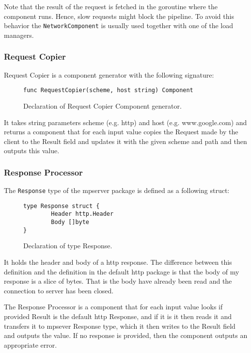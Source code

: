 Note that the result of the request is fetched in the goroutine where the
component runs. Hence, slow requests might block the pipeline. To avoid
this behavior the \texttt{NetworkComponent} is usually used together with one
of the load managers.

\subsubsection{Request Copier}
Request Copier is a component generator with the following signature:
\begin{figure}[h]
\centering
\begin{lstlisting}
func RequestCopier(scheme, host string) Component
\end{lstlisting}
\caption[scale=1.0]{Declaration of Request Copier Component generator.}
\label{fig:RequestCopier}
\end{figure}
It takes string parameters scheme (e.g. http) and host (e.g. www.google.com) 
and returns a component that for each input value copies the Request made 
by the client to the Result field and updates it with the given scheme and 
path and then outputs this value.

\subsubsection{Response Processor}
The \texttt{Response} type of the mpserver package is defined as a following struct:

\begin{figure}[h]
\centering
\begin{lstlisting}
type Response struct {
		Header http.Header
		Body []byte
}
\end{lstlisting}
\caption[scale=1.0]{Declaration of type Response.}
\label{fig:Response}
\end{figure}

It holds the header and body of a http response. The difference between
this definition and the definition in the default http package is that
the body of my response is a slice of bytes. That is the body have already been
read and the connection to server has been closed.

The Response Processor is a component that for each input value
looks if provided Result is the default http Response, and if it is
it then reads it and transfers it to mpsever Response type, which it
then writes to the Result field and outputs the value. If no response
is provided, then the component outputs an appropriate error.

